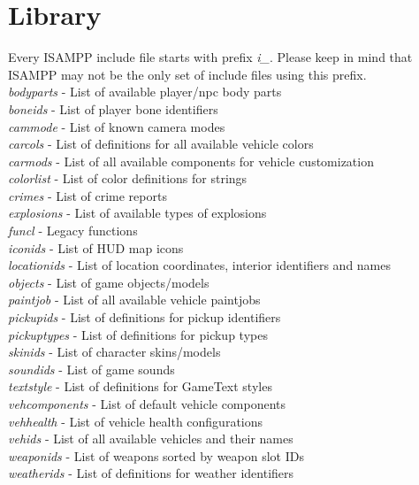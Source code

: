 \documentclass{article}
\begin{document}
\section{Library}
Every ISAMPP include file starts with prefix \textit{i\_}. Please keep in mind that ISAMPP may not be the only set of include files using this prefix.
\bigskip
\\\textit{bodyparts} - List of available player/npc body parts
\\\textit{boneids} - List of player bone identifiers
\\\textit{cammode} - List of known camera modes
\\\textit{carcols} - List of definitions for all available vehicle colors
\\\textit{carmods} - List of all available components for vehicle customization
\\\textit{colorlist} - List of color definitions for strings
\\\textit{crimes} - List of crime reports
\\\textit{explosions} - List of available types of explosions
\\\textit{funcl} - Legacy functions
\\\textit{iconids} - List of HUD map icons
\\\textit{locationids} - List of location coordinates, interior identifiers and names
\\\textit{objects} - List of game objects/models
\\\textit{paintjob} - List of all available vehicle paintjobs
\\\textit{pickupids} - List of definitions for pickup identifiers
\\\textit{pickuptypes} - List of definitions for pickup types
\\\textit{skinids} - List of character skins/models
\\\textit{soundids} - List of game sounds
\\\textit{textstyle} - List of definitions for GameText styles
\\\textit{vehcomponents} - List of default vehicle components
\\\textit{vehhealth} - List of vehicle health configurations
\\\textit{vehids} - List of all available vehicles and their names
\\\textit{weaponids} - List of weapons sorted by weapon slot IDs
\\\textit{weatherids} - List of definitions for weather identifiers
\end{document}
